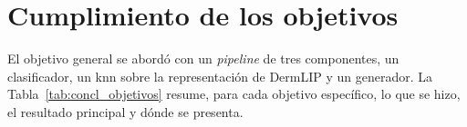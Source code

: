 \section{Cumplimiento de los objetivos}
\label{sec:concl_objetivos}

El objetivo general se abordó con un \emph{pipeline} de tres componentes, un clasificador, un \gls{knn} sobre la
representación de DermLIP y un generador. La Tabla~\ref{tab:concl_objetivos} resume, para cada objetivo específico,
lo que se hizo, el resultado principal y dónde se presenta.

